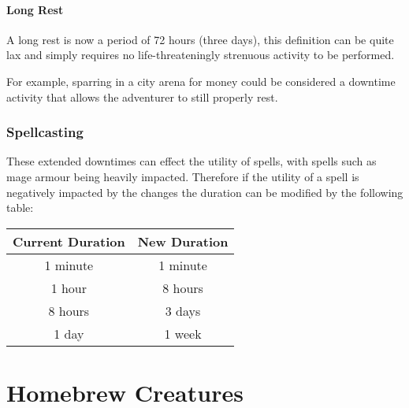 \documentclass[10pt,twoside,twocolumn,nomultitoc,openany,nodeprecatedcode]{dndbook}
\begin{document}
	\subsection{Long Rest}
	A long rest is now a period of 72 hours (three days), this definition can be quite lax and simply requires no life-threateningly strenuous activity to be performed. 
	
	For example, sparring in a city arena for money could be considered a downtime activity that allows the adventurer to still properly rest.

	\section{Spellcasting}
	These extended downtimes can effect the utility of spells, with spells such as mage armour being heavily impacted. Therefore if the utility of a spell is negatively impacted by the changes the duration can be modified by the following table:
	
	\begin{table}[h!]
		\centering
		\begin{tabular}{@{}cc@{}}
			\toprule
			Current Duration & New Duration \\ \midrule
			1 minute         & 1 minute     \\
			1 hour           & 8 hours      \\
			8 hours          & 3 days       \\
			1 day            & 1 week       \\ \bottomrule
		\end{tabular}
	\end{table}

	\part{Homebrew Creatures}
\end{document}
